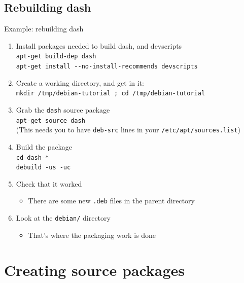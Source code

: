 \documentclass[10pt,final]{beamer}
\begin{document}
\subsection{Rebuilding dash}
\begin{frame}{Example: rebuilding dash}
\begin{enumerate}
\item Install packages needed to build dash, and devscripts\\
  {\texttt{apt-get build-dep dash}}\\
  {\texttt{apt-get install -{}-no-install-recommends devscripts}}
  \hbr
\item Create a working directory, and get in it:\\
 \texttt{mkdir /tmp/debian-tutorial ; cd /tmp/debian-tutorial}
  \hbr
\item Grab the \texttt{dash} source package\\
  \texttt{apt-get source dash}\\ 
  {\small (This needs you to have \texttt{deb-src} lines in your \texttt{/etc/apt/sources.list})}
  \hbr
\item Build the package\\
  {\texttt{cd dash-*\\ debuild -us -uc}}

  \hbr
\item Check that it worked
	\begin{itemize}
		\item  There are some new \texttt{.deb} files in the parent directory
	\end{itemize}
    \hbr
\item Look at the \texttt{debian/} directory
	\begin{itemize}
		\item That's where the packaging work is done
	\end{itemize}
\end{enumerate}
\end{frame}

\section{Creating source packages}
\end{document}
